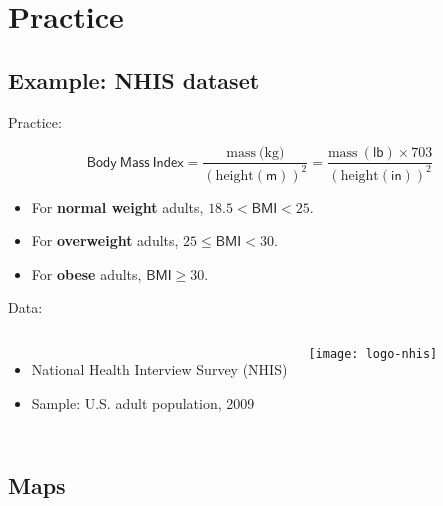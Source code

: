 \documentclass[t]{beamer}
\begin{document}
	\section{Practice}
	
	\subsection{Example: NHIS dataset}
	
	\begin{frame}[t]{Practice: }

		$$\mathsf{Body~Mass~Index} = \frac{\mbox{mass} \ \mbox{(kg)}}{\left( \mbox{height}(\mathsf{m})\right)^2} = \frac{\mbox{mass} \ \mathsf{(lb)} \times 703}{\left(\mbox{height} (\mathsf{in})\right)^2}$$
		
		\vspace{1em}

		\begin{itemize}
			\item For \textbf{normal weight} adults, $18.5 < \mathsf{BMI} < 25$.
			\item For \textbf{overweight} adults, $25 \leq \mathsf{BMI} < 30$.
			\item For \textbf{obese }adults, $\mathsf{BMI} \geq 30$.		
		\end{itemize}

		\vspace{1em}
		
    Data:
	
			\begin{columns}[c]
				
				\begin{itemize}
					\item National Health Interview Survey (NHIS)
					\item Sample: U.S. adult population, 2009
				\end{itemize}
	
				\texttt{[image: logo-nhis]}
			\end{columns}
	
	\end{frame}

	\subsection{Maps}
	
  \begin{frame}[t, plain]{}
  \end{frame}
\end{document}
